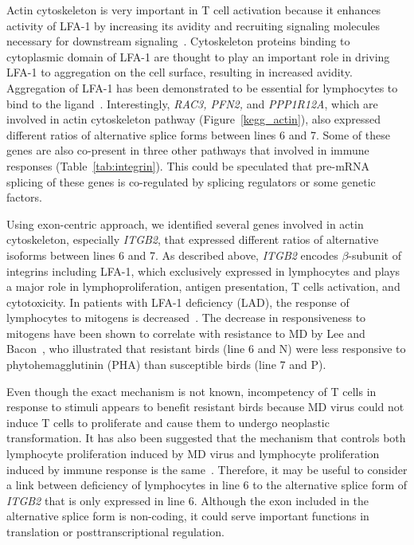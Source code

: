 \documentclass[10pt]{article}
\begin{document}
Actin cytoskeleton is very important in T cell activation because it enhances
activity of LFA-1 by increasing its avidity and recruiting signaling molecules
necessary for downstream signaling~\cite{dustin2000immunological,
van2000avidity}.  Cytoskeleton proteins binding to cytoplasmic domain of LFA-1
are thought to play an important role in driving LFA-1 to aggregation on the
cell surface, resulting in increased avidity.  Aggregation of LFA-1 has been
demonstrated to be essential for lymphocytes to bind to the
ligand~\cite{van1994extracellular}.  Interestingly, {\em RAC3, PFN2,} and {\em
PPP1R12A}, which are involved in actin cytoskeleton pathway
(Figure~\ref{kegg_actin}), also expressed different ratios of alternative splice
forms between lines 6 and 7.  Some of these genes are also co-present in three
other pathways that involved in immune responses (Table~\ref{tab:integrin}).
This could be speculated that pre-mRNA splicing of these genes is co-regulated
by splicing regulators or some genetic factors.

Using exon-centric approach, we identified several genes involved in actin
cytoskeleton, especially {\em ITGB2}, that expressed different ratios of
alternative isoforms between lines 6 and 7.  As described above, {\em ITGB2}
encodes $\beta$-subunit of integrins including LFA-1, which exclusively
expressed in lymphocytes and plays a major role in lymphoproliferation, antigen
presentation, T cells activation, and cytotoxicity.  In patients with LFA-1
deficiency (LAD), the response of lymphocytes to mitogens is
decreased~\cite{springer1987lymphocyte}.  The decrease in responsiveness to
mitogens have been shown to correlate with resistance to MD by Lee and
Bacon~\cite{lee1983ontogeny}, who illustrated that resistant birds (line 6 and
N) were less responsive to phytohemagglutinin (PHA) than susceptible birds (line
7 and P).

Even though the exact mechanism is not known, incompetency of T cells in
response to stimuli appears to benefit resistant birds because MD virus could
not induce T cells to proliferate and cause them to undergo neoplastic
transformation.  It has also been suggested that the mechanism that controls
both lymphocyte proliferation induced by MD virus and lymphocyte proliferation
induced by immune response is the same~\cite{pazderka1975histocompatibility}.
Therefore, it may be useful to consider a link between deficiency of lymphocytes
in line 6 to the alternative splice form of {\em ITGB2} that is only expressed
in line 6.  Although the exon included in the alternative splice form is
non-coding, it could serve important functions in translation or
posttranscriptional regulation.
\end{document}
